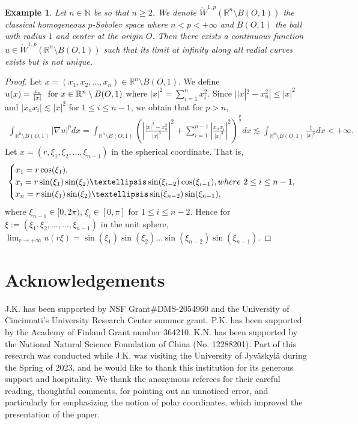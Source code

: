 \documentclass[10pt]{amsart}
\newtheorem{example}[theorem]{Example}
\numberwithin{equation}{section}
\begin{document}
\begin{example}
	\label{example-p>n}Let $n\in\mathbb N$ be so that $n\geq 2$. We denote $\dot W^{1,p}(\mathbb R^n\setminus B(O,1))$  the classical homogeneous $p$-Sobolev space where $n<p<+\infty$ and $B(O,1)$  the ball with radius $1$ and center at the origin $O$. Then
 there exists a continuous function $u\in \dot W^{1,p}(\mathbb R^n\setminus B(O,1))$ such that its limit at infinity  along all radial curves exists but is not unique.
\end{example}
\begin{proof}
	Let $x=(x_1,x_2,\ldots,x_n)\in\mathbb R^n\setminus B(O,1)$. We define 
		$u(x)=\frac{x_n}{|x|} \text{\rm \ \ for  $x\in\mathbb R^n\setminus B(O,1)$}
		$
	 where $|x|^2=\sum_{i=1}^nx^2_i$.
 Since $||x|^2-x_n^2|\leq |x|^2$ and $|x_nx_i|\lesssim |x|^2$ for $1\le i\le n-1$, we obtain that for $p>n$,
		\begin{align*}
		\int_{\mathbb R^n\setminus B(O,1)}|\nabla u|^pdx
		= \int_{\mathbb R^n\setminus B(O,1)} \left ({\left | \frac{|x|^2-x_n^2}{|x|^{{3}}}\right |^2+\sum_{i=1}^{n-1}\left |\frac{x_nx_i}{|x|^{{3}}}\right |^2}\right )^{\frac{p}{2}}dx
		\lesssim  \int_{\mathbb R^n\setminus B(O,1)}\frac{1}{|x|^p}dx<{+\infty}.
		\end{align*}
	Let $x=(r,\xi_1,\xi_2,\ldots,\xi_{n-1})$ in the spherical coordinate.  That is, 
	\[\begin{cases}
		x_1=r\cos(\xi_1),\\
		 x_{i}=r\sin(\xi_1)\sin(\xi_2)\ldots\sin(\xi_{i-2})\cos(\xi_{i-1}), \rm where\ 2\leq i\leq n-1,\\
		  x_{n}=r\sin(\xi_1)\sin(\xi_2)\ldots\sin(\xi_{n-2})\sin(\xi_{n-1}),
	\end{cases}
	\]
	where $\xi_{n-1}\in[0,2\pi)$, $\xi_{i}\in[0,\pi]$ for  $1\le i\le n-2$.
	Hence for $\xi:=(\xi_1,\xi_2,\ldots,\ldots,\xi_{n-1})$ in the unit sphere,
	$\lim_{r\to{+\infty}}u(r\xi)=\sin(\xi_1)\sin(\xi_2)\ldots\sin(\xi_{n-2})\sin(\xi_{n-1}).
	$
	
\end{proof}

\section*{Acknowledgements}
J.K. has been supported by NSF Grant\#DMS-2054960 and the University of Cincinnati's University Research Center summer grant.  P.K. has been supported by the Academy of Finland Grant number 364210.
K.N. has been supported by the National Natural Science Foundation of China (No. 12288201).  Part of this research was conducted while J.K. was visiting the University of Jyv\"askyl\"a during the Spring of 2023, and he would like to thank this institution for its generous support and hospitality.
{
We thank the anonymous referees for their careful reading, thoughtful comments, for pointing out an unnoticed error, and
particularly for emphasizing the notion of polar coordinates, which  improved the presentation of the paper.
}
\end{document}
